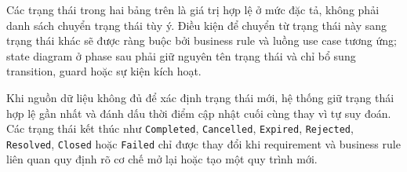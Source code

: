Các trạng thái trong hai bảng trên là giá trị hợp lệ ở mức đặc tả, không phải danh sách chuyển trạng thái tùy ý. Điều kiện để chuyển từ trạng thái này sang trạng thái khác sẽ được ràng buộc bởi business rule và luồng use case tương ứng; state diagram ở phase sau phải giữ nguyên tên trạng thái và chỉ bổ sung transition, guard hoặc sự kiện kích hoạt.

Khi nguồn dữ liệu không đủ để xác định trạng thái mới, hệ thống giữ trạng thái hợp lệ gần nhất và đánh dấu thời điểm cập nhật cuối cùng thay vì tự suy đoán. Các trạng thái kết thúc như \texttt{Completed}, \texttt{Cancelled}, \texttt{Expired}, \texttt{Rejected}, \texttt{Resolved}, \texttt{Closed} hoặc \texttt{Failed} chỉ được thay đổi khi requirement và business rule liên quan quy định rõ cơ chế mở lại hoặc tạo một quy trình mới.

\clearpage
